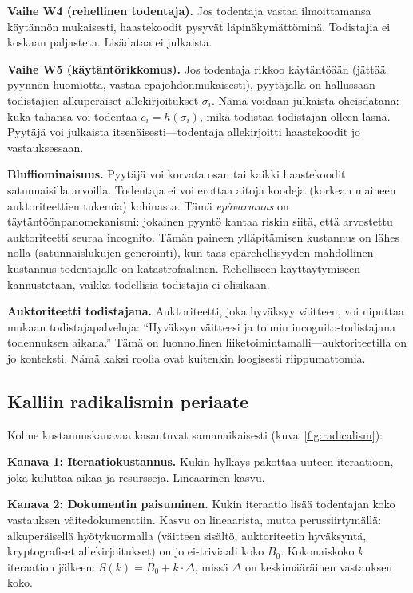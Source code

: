 \documentclass[11pt,a4paper,twocolumn]{article}
\begin{document}
\textbf{Vaihe W4 (rehellinen todentaja).} Jos todentaja vastaa ilmoittamansa käytännön mukaisesti, haastekoodit pysyvät läpinäkymättöminä. Todistajia ei koskaan paljasteta. Lisädataa ei julkaista.

\textbf{Vaihe W5 (käytäntörikkomus).} Jos todentaja rikkoo käytäntöään (jättää pyynnön huomiotta, vastaa epäjohdonmukaisesti), pyytäjällä on hallussaan todistajien alkuperäiset allekirjoitukset $\sigma_i$. Nämä voidaan julkaista oheisdatana: kuka tahansa voi todentaa $c_i = h(\sigma_i)$, mikä todistaa todistajan olleen läsnä. Pyytäjä voi julkaista itsenäisesti---todentaja allekirjoitti haastekoodit jo vastauksessaan.

\textbf{Bluffiominaisuus.} Pyytäjä voi korvata osan tai kaikki haastekoodit satunnaisilla arvoilla. Todentaja ei voi erottaa aitoja koodeja (korkean maineen auktoriteettien tukemia) kohinasta. Tämä \emph{epävarmuus} on täytäntöönpanomekanismi: jokainen pyyntö kantaa riskin siitä, että arvostettu auktoriteetti seuraa incognito. Tämän paineen ylläpitämisen kustannus on lähes nolla (satunnaislukujen generointi), kun taas epärehellisyyden mahdollinen kustannus todentajalle on katastrofaalinen. Rehelliseen käyttäytymiseen kannustetaan, vaikka todellisia todistajia ei olisikaan.

\textbf{Auktoriteetti todistajana.} Auktoriteetti, joka hyväksyy väitteen, voi niputtaa mukaan todistajapalveluja: ``Hyväksyn väitteesi ja toimin incognito-todistajana todennuksen aikana.'' Tämä on luonnollinen liiketoimintamalli---auktoriteetilla on jo konteksti. Nämä kaksi roolia ovat kuitenkin loogisesti riippumattomia.

\subsection{Kalliin radikalismin periaate}

Kolme kustannuskanavaa kasautuvat samanaikaisesti (kuva~\ref{fig:radicalism}):

\textbf{Kanava 1: Iteraatiokustannus.} Kukin hylkäys pakottaa uuteen iteraatioon, joka kuluttaa aikaa ja resursseja. Lineaarinen kasvu.

\textbf{Kanava 2: Dokumentin paisuminen.} Kukin iteraatio lisää todentajan koko vastauksen väitedokumenttiin. Kasvu on lineaarista, mutta perussiirtymällä: alkuperäisellä hyötykuormalla (väitteen sisältö, auktoriteetin hyväksyntä, kryptografiset allekirjoitukset) on jo ei-triviaali koko $B_0$. Kokonaiskoko $k$ iteraation jälkeen: $S(k) = B_0 + k \cdot \Delta$, missä $\Delta$ on keskimääräinen vastauksen koko.
\end{document}
